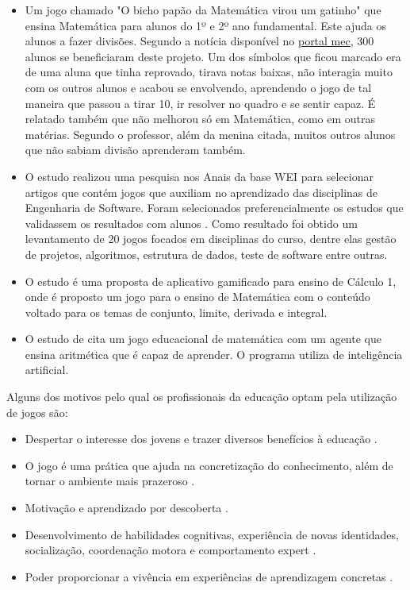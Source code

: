 \begin{itemize}
  \item Um jogo chamado "O bicho papão da Matemática virou um gatinho" que ensina Matemática para alunos do 1º e 2º ano fundamental. Este ajuda os alunos a fazer divisões. Segundo a notícia disponível no \href{http://portal.mec.gov.br/component/content/article?id=72701}{portal mec}, 300 alunos se beneficiaram deste projeto. Um dos símbolos que ficou marcado era de uma aluna que tinha reprovado, tirava notas baixas, não interagia muito com os outros alunos e acabou se envolvendo, aprendendo o jogo de tal maneira que passou a tirar 10, ir resolver no quadro e se sentir capaz. É relatado também que não melhorou só em Matemática, como em outras matérias. Segundo o professor, além da menina citada, muitos outros alunos que não sabiam divisão aprenderam também.


  \item O estudo \cite{sucessoJogoEngSoft} realizou uma pesquisa nos Anais da base WEI para selecionar artigos que contém jogos que auxiliam no aprendizado das disciplinas de Engenharia de Software. Foram selecionados preferencialmente os estudos que validassem os resultados com alunos \cite{sucessoJogoEngSoft}. Como resultado foi obtido um levantamento de 20 jogos focados em disciplinas do curso, dentre elas gestão de projetos, algoritmos, estrutura de dados, teste de software entre outras.

  \item O estudo \cite{appcalculo} é uma proposta de aplicativo gamificado para ensino de Cálculo 1, onde é proposto um jogo para o ensino de Matemática com o conteúdo voltado para os temas de conjunto, limite, derivada e integral.

  \item O estudo de \cite{jogoSuporteMat} cita um jogo educacional de matemática com um agente que ensina aritmética que é capaz de aprender. O programa utiliza de inteligência artificial.   
\end{itemize}


Alguns dos motivos pelo qual os profissionais da educação optam pela utilização de jogos são:

\begin{itemize}
	\item Despertar o interesse dos jovens e trazer diversos benefícios à educação \cite{appcalculo}.
	\item O jogo é uma prática que ajuda na concretização do conhecimento, além de tornar o ambiente mais prazeroso \cite{jogoPratPedagoc}. 
	\item Motivação e aprendizado por descoberta .
	\item Desenvolvimento de habilidades cognitivas, experiência de novas identidades, socialização, coordenação motora e comportamento expert \cite[p. 3 e 4]{savi}.
	\item Poder proporcionar a vivência em experiências de aprendizagem concretas .
\end{itemize}

